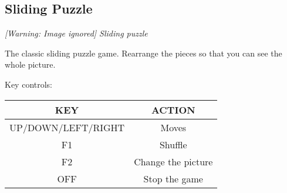 \subsection{Sliding Puzzle}
{\centering\itshape
  [Warning: Image ignored] %
 \newline
Sliding puzzle
\par}

The classic sliding puzzle game.  Rearrange the pieces so that you can
see the whole picture.

Key controls:

\begin{table}[h!]
\begin{center}
\begin{tabular}{|c|c|}
\hline
KEY & ACTION \\\hline
UP/DOWN/LEFT/RIGHT & Moves \\\hline
F1 & Shuffle \\\hline
F2 & Change the picture \\\hline
OFF & Stop the game \\\hline
\end{tabular}
\end{center}
\end{table}


